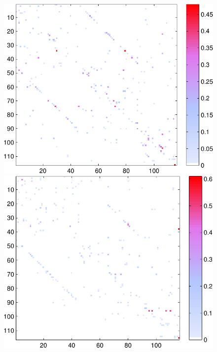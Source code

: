 \documentclass[a4paper, english]{article}
\begin{document}
\begin{figure}[h!]
\hspace{-0.4in}
\begin{minipage}[t]{1.2\textwidth}
  \centering
  \includegraphics[height=0.26\textheight]{images/new/assym_subj1_expl-crop}
  \includegraphics[height=0.26\textheight]{images/new/assym_subj2_expl-crop}

\end{minipage}
\end{figure}
\end{document}
